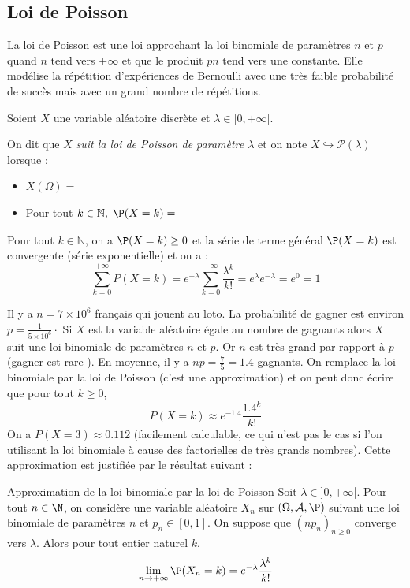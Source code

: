 \documentclass[french,11pt,twoside]{VcCours}
\begin{document}
\subsection{Loi de Poisson}
La loi de Poisson est une loi \og approchant \fg la loi binomiale de paramètres $n$ et $p$ quand $n$ tend vers $+ \infty$ et que le produit $pn$ tend vers une constante. Elle modélise la répétition d'expériences de Bernoulli avec une très faible probabilité de succès mais avec un grand nombre de répétitions.


\begin{Definition}{}
Soient $X$ une variable aléatoire discrète et $\lambda \in ]0,+\infty[$.


On dit que $X$ \emph{suit la loi de Poisson de paramètre $\lambda$} et on note $X \hookrightarrow \mathcal{P}(\lambda)$ lorsque :
\begin{itemize}
 \item $X(\Omega)=\phantom{\mathbb{N}}$
 \item Pour tout $ k \in \mathbb{N},\; \P(X=k)=\phantom{e^{-\lambda}\frac{\lambda^k}{k!} \cdot}$
\end{itemize}
\end{Definition}

\medskip

Pour tout $k \in \mathbb{N}$, on a $\P(X=k) \geq 0$ et la série de terme général $\P(X=k)$ est convergente (série exponentielle) et on a :
$$ \sum_{k=0}^{+ \infty} P(X=k) = e^{-\lambda} \sum_{k=0}^{+ \infty} \dfrac{\lambda^k}{k!} = e^{\lambda} e^{- \lambda} = e^0=1$$


\begin{Exemple}{} Il y a $n=7 \times 10^{6}$ français qui jouent au loto. La probabilité de gagner est environ $p= \frac{1}{5\times 10^6}\cdot$ Si $X$ est la variable aléatoire égale au nombre de gagnants alors $X$ suit une loi binomiale de paramètres $n$ et $p$. Or $n$ est très grand par rapport à $p$ (gagner est \og rare \fg). En moyenne, il y a $np = \frac{7}{5}=1.4$ gagnants. On remplace la loi binomiale par la loi de Poisson (c'est une approximation) et on peut donc écrire que pour tout $k \geq 0$,
\[ P(X=k) \approx e^{-1.4} \frac{1.4^k}{k!}\]
On a $P(X=3) \approx 0.112$ (facilement calculable, ce qui n'est pas le cas si l'on utilisant la loi binomiale à cause des factorielles de très grands nombres). Cette approximation est justifiée par le résultat suivant :
\end{Exemple}

\begin{Proposition}{Approximation de la loi binomiale par la loi de Poisson}
Soit $\lambda \in ]0,+\infty[$. Pour tout $n \in \N$, on considère une variable aléatoire $X_n$ sur $(\Omega, \mathcal{A}, \P)$ suivant une loi binomiale de paramètres $n$ et $p_n \in [0,1]$. On suppose que $(np_n)_{n \geq 0}$ converge vers $\lambda$. Alors pour tout entier naturel $k$, 
 $$ \lim_{n\to +\infty} \P(X_n = k) = e^{-\lambda} \frac{\lambda^k}{k!}$$
\end{Proposition}
\end{document}
